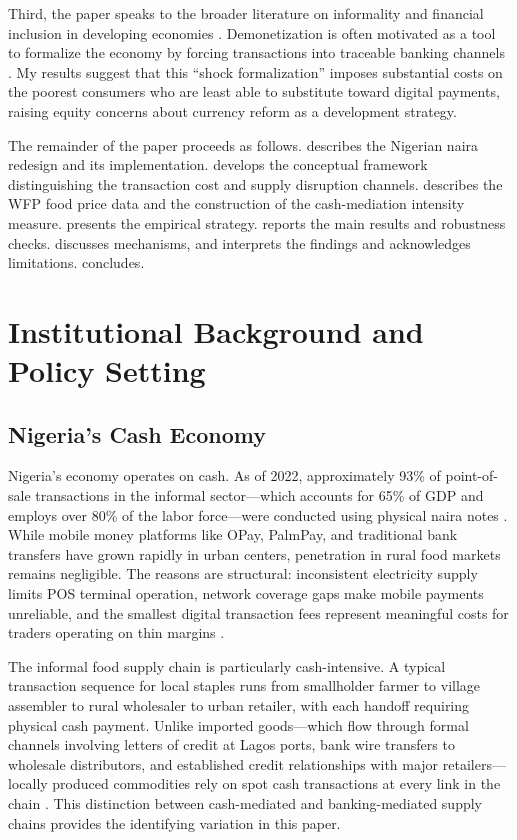 \documentclass[12pt]{article}
\begin{document}
Third, the paper speaks to the broader literature on informality and financial inclusion in developing economies \citep{porta2014, medina2018, elgin2021}. Demonetization is often motivated as a tool to formalize the economy by forcing transactions into traceable banking channels \citep{rogoff2016}. My results suggest that this ``shock formalization'' imposes substantial costs on the poorest consumers who are least able to substitute toward digital payments, raising equity concerns about currency reform as a development strategy.

The remainder of the paper proceeds as follows.  describes the Nigerian naira redesign and its implementation.  develops the conceptual framework distinguishing the transaction cost and supply disruption channels.  describes the WFP food price data and the construction of the cash-mediation intensity measure.  presents the empirical strategy.  reports the main results and robustness checks.  discusses mechanisms, and  interprets the findings and acknowledges limitations.  concludes.


\section{Institutional Background and Policy Setting}
\label{sec:background}

\subsection{Nigeria's Cash Economy}

Nigeria's economy operates on cash. As of 2022, approximately 93\% of point-of-sale transactions in the informal sector---which accounts for 65\% of GDP and employs over 80\% of the labor force---were conducted using physical naira notes \citep{efina2022, imf2023nigeria}. While mobile money platforms like OPay, PalmPay, and traditional bank transfers have grown rapidly in urban centers, penetration in rural food markets remains negligible. The reasons are structural: inconsistent electricity supply limits POS terminal operation, network coverage gaps make mobile payments unreliable, and the smallest digital transaction fees represent meaningful costs for traders operating on thin margins \citep{demirguc-kunt2022, aker2017}.

The informal food supply chain is particularly cash-intensive. A typical transaction sequence for local staples runs from smallholder farmer to village assembler to rural wholesaler to urban retailer, with each handoff requiring physical cash payment. Unlike imported goods---which flow through formal channels involving letters of credit at Lagos ports, bank wire transfers to wholesale distributors, and established credit relationships with major retailers---locally produced commodities rely on spot cash transactions at every link in the chain \citep{adesina2023, gyimah-brempong2016food}. This distinction between cash-mediated and banking-mediated supply chains provides the identifying variation in this paper.
\end{document}
